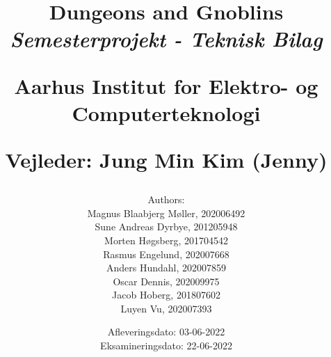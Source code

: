 \newcommand{\authorName}{}
\newcommand{\titleName}{Dungeons and Gnoblins}
\newcommand{\subject}{Semesterprojekt - Teknisk Bilag}
\newcommand{\vejleder}{Vejleder: Jung Min Kim (Jenny)}
\newcommand{\institute}{Aarhus Institut for Elektro- og Computerteknologi}
\begin{titlepage}
  \centering
    \title
    {
      \Huge \textbf{\titleName}\\
      \scale{\numberSQRTTWO}{\vspace{\sol pt}}
      \LARGE \textit{\subject}
      \scale{\numberSQRTTWO}{\rule{\linewidth}{\sol pt}}

      \textbf{\institute}

      \vejleder

      \author
    {
      \LARGE Authors: \\
      Magnus Blaabjerg Møller, 202006492 \\
      Sune Andreas Dyrbye, 201205948 \\
      Morten Høgsberg, 201704542 \\
      Rasmus Engelund, 202007668 \\
      Anders Hundahl, 202007859 \\
      Oscar Dennis, 202009975 \\
      Jacob Hoberg, 201807602 \\
      Luyen Vu, 202007393 \\
    }
      \date{
        \LARGE Afleveringsdato: 03-06-2022 \\
        \LARGE Eksamineringsdato: 22-06-2022
      }
    }
\end{titlepage}
